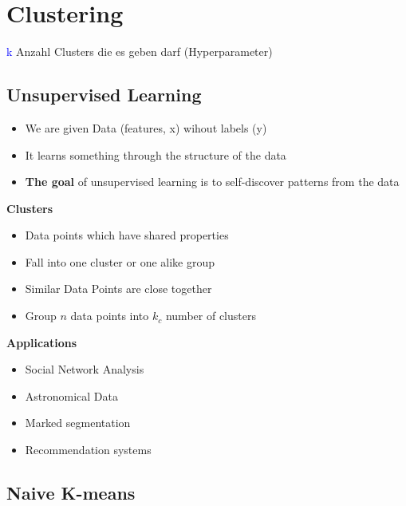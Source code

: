 \section{Clustering}
\textcolor{blue}{k} Anzahl Clusters die es geben darf (Hyperparameter)

\subsection{Unsupervised Learning}
\begin{itemize}
    \item We are given Data (features, x) wihout labels (y)
    \item It learns something through the structure of the data
    \item \textbf{The goal} of unsupervised learning is to self-discover patterns from the data
\end{itemize}
\vspace{10pt}
\textbf{Clusters}
\begin{itemize}
    \item Data points which have shared properties
    \item Fall into one cluster or one alike group
    \item Similar Data Points are close together
    \item Group $n$ data points into $k_c$ number of clusters
\end{itemize}
\vspace{10pt}
\textbf{Applications}
\begin{itemize}
    \item Social Network Analysis
    \item Astronomical Data
    \item Marked segmentation
    \item Recommendation systems
\end{itemize}
\subsection{Naive K-means}

